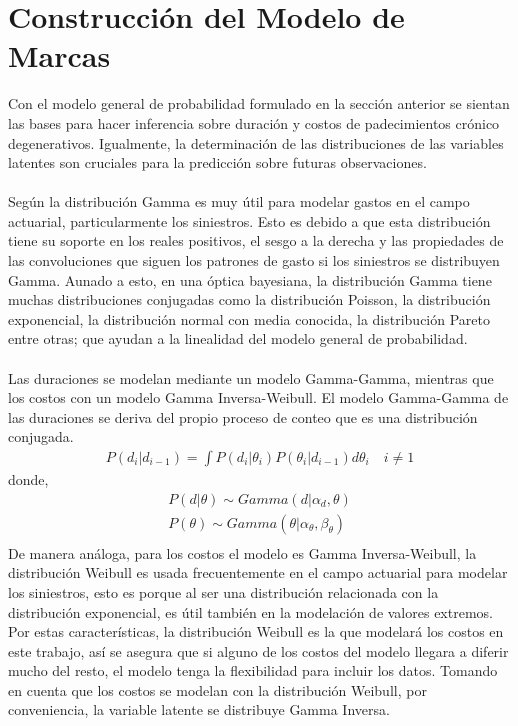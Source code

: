 \section{Construcci\'on del Modelo de Marcas}
Con el modelo general de probabilidad formulado en la secci\'on anterior se sientan las bases para hacer inferencia sobre duraci\'on y costos de padecimientos cr\'onico degenerativos. Igualmente, la determinaci\'on de las distribuciones de las variables latentes son cruciales para la predicci\'on sobre futuras observaciones.\\
\\
Seg\'un \cite{fader2013gamma} la distribuci\'on Gamma es muy \'util para modelar gastos en el campo actuarial, particularmente los siniestros. Esto es debido a que esta distribuci\'on tiene su soporte en los reales positivos, el sesgo a la derecha y las propiedades de las convoluciones que siguen los patrones de gasto si los siniestros se distribuyen Gamma. Aunado a esto, en una \'optica bayesiana, la distribuci\'on Gamma tiene muchas distribuciones conjugadas como la distribuci\'on Poisson, la distribuci\'on exponencial, la distribuci\'on normal con media conocida, la distribuci\'on Pareto entre otras; que ayudan a la linealidad del modelo general de probabilidad.\\
\\
Las duraciones se modelan mediante un modelo Gamma-Gamma, mientras que los costos con un modelo Gamma Inversa-Weibull. El modelo Gamma-Gamma de las duraciones se deriva del propio proceso de conteo que es una distribuci\'on conjugada.
\begin{align*}
P(d_i|d_{i-1})=\int P(d_i|\theta_i) P(\theta_i|d_{i-1})d\theta_i \quad i \neq 1
\end{align*}
donde,
\begin{align*}
P(d|\theta) \sim Gamma(d|\alpha_d,\theta)\\
P(\theta) \sim Gamma(\theta|\alpha_{\theta},\beta_\theta)\\
\end{align*}
De manera an\'aloga, para los costos el modelo es Gamma Inversa-Weibull, la distribuci\'on Weibull es usada frecuentemente en el campo actuarial para modelar los siniestros, esto es porque al ser una distribuci\'on relacionada con la distribuci\'on exponencial, es \'util tambi\'en en la modelaci\'on de valores extremos. Por estas caracter\'isticas, la distribuci\'on Weibull es la que modelar\'a los costos en este trabajo, as\'i se asegura que si alguno de los costos del modelo llegara a diferir mucho del resto, el modelo tenga la flexibilidad para incluir los datos. Tomando en cuenta que los costos se modelan con la distribuci\'on Weibull, por conveniencia, la variable latente se distribuye Gamma Inversa.
